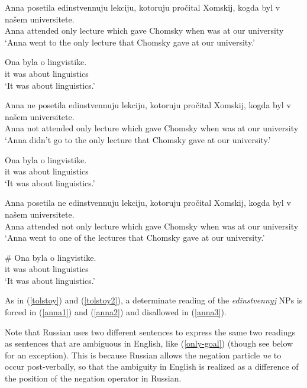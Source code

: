 \begin{exe}
	\ex \label{anna1} \begin{xlist}
		\ex \gll Anna posetila edinstvennuju lekciju, kotoruju pro\v{c}ital Xomskij, kogda byl v na\v{s}em universitete.\\
		Anna attended only lecture which gave Chomsky when was at our university\\
		\glt `Anna went to the only lecture that Chomsky gave at our university.'

		\ex \gll Ona byla o lingvistike.\\
		it was about linguistics\\
		\glt `It was about linguistics.'
	\end{xlist}

	\ex \label{anna2} \begin{xlist}
		\ex \gll Anna ne posetila edinstvennuju lekciju, kotoruju pro\v{c}ital Xomskij, kogda byl v na\v{s}em universitete.\\
		Anna not attended only lecture which gave Chomsky when was at our university\\
		\glt `Anna didn't go to the only lecture that Chomsky gave at our university.'

		\ex \gll Ona byla o lingvistike.\\
		it was about linguistics\\
		\glt `It was about linguistics.'
	\end{xlist}

	\ex \label{anna3} \begin{xlist}
		\ex \gll Anna posetila ne edinstvennuju lekciju, kotoruju pro\v{c}ital Xomskij, kogda byl v na\v{s}em universitete.\\
		Anna attended not only lecture which gave Chomsky when was at our university\\
		\glt `Anna went to one of the lectures that Chomsky gave at our university.'

		\ex \gll \# Ona byla o lingvistike.\\
		{} it was about linguistics\\
		\glt `It was about linguistics.'
	\end{xlist}
\end{exe}

As in (\ref{tolstoy}) and (\ref{tolstoy2}), a determinate reading of the \textit{edinstvennyj} NPs is forced in (\ref{anna1}) and (\ref{anna2}) and disallowed in (\ref{anna3}).

Note that Russian uses two different sentences to express the same two readings as sentences that are ambiguous in English, like (\ref{only-goal}) (though see below for an exception). This is because Russian allows the negation particle \textit{ne} to occur post-verbally, so that the ambiguity in English is realized as a difference of the position of the negation operator in Russian.

